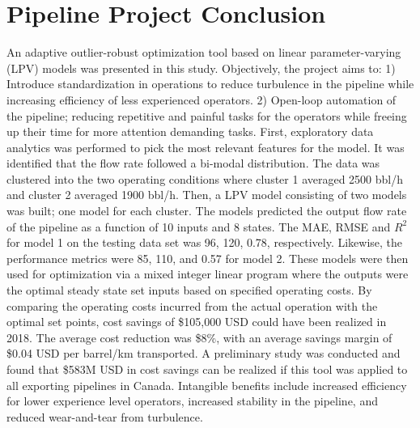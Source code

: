 \section{Pipeline Project Conclusion}
An adaptive outlier-robust optimization tool based on linear parameter-varying (LPV) models was presented in this study. Objectively, the project aims to: 1) Introduce standardization in operations to reduce turbulence in the pipeline while increasing efficiency of less experienced operators. 2) Open-loop automation of the pipeline; reducing repetitive and painful tasks for the operators while freeing up their time for more attention demanding tasks.  First, exploratory data analytics was performed to pick the most relevant features for the model. It was identified that the flow rate followed a bi-modal distribution.  The data was clustered into the two operating conditions where cluster 1 averaged 2500 bbl/h and cluster 2 averaged 1900 bbl/h.  Then, a LPV model consisting of two models was built; one model for each cluster. The models predicted the output flow rate of the pipeline as a function of 10 inputs and 8 states. The MAE, RMSE and $R^2$ for model 1 on the testing data set was 96, 120, 0.78, respectively.  Likewise, the performance metrics were 85, 110, and 0.57 for model 2.  These models were then used for optimization via a mixed integer linear program where the outputs were the optimal steady state set inputs based on specified operating costs.  By comparing the operating costs incurred from the actual operation with the optimal set points, cost savings of \$105,000 USD could have been realized in 2018.  The average cost reduction was \$8\%, with an average savings margin of \$0.04 USD per barrel/km transported.  A preliminary study was conducted and found that \$583M USD in cost savings can be realized if this tool was applied to all exporting pipelines in Canada. Intangible benefits include increased efficiency for lower experience level operators, increased stability in the pipeline, and reduced wear-and-tear from turbulence.
